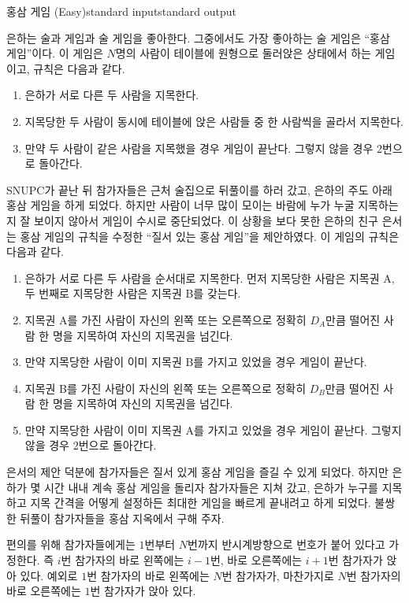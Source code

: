 \begin{problem}{홍삼 게임 (Easy)}{standard input}{standard output}

은하는 술과 게임과 술 게임을 좋아한다. 그중에서도 가장 좋아하는 술 게임은 ``홍삼 게임''이다. 이 게임은 $N$명의 사람이 테이블에 원형으로 둘러앉은 상태에서 하는 게임이고, 규칙은 다음과 같다.

\begin{enumerate}
\item{은하가 서로 다른 두 사람을 지목한다.}
\item{지목당한 두 사람이 동시에 테이블에 앉은 사람들 중 한 사람씩을 골라서 지목한다.}
\item{만약 두 사람이 같은 사람을 지목했을 경우 게임이 끝난다. 그렇지 않을 경우 2번으로 돌아간다.}
\end{enumerate}

SNUPC가 끝난 뒤 참가자들은 근처 술집으로 뒤풀이를 하러 갔고, 은하의 주도 아래 홍삼 게임을 하게 되었다. 하지만 사람이 너무 많이 모이는 바람에 누가 누굴 지목하는지 잘 보이지 않아서 게임이 수시로 중단되었다. 이 상황을 보다 못한 은하의 친구 은서는 홍삼 게임의 규칙을 수정한 ``질서 있는 홍삼 게임''을 제안하였다. 이 게임의 규칙은 다음과 같다.

\begin{enumerate}
\item{은하가 서로 다른 두 사람을 순서대로 지목한다. 먼저 지목당한 사람은 지목권 A, 두 번째로 지목당한 사람은 지목권 B를 갖는다.}
\item{지목권 A를 가진 사람이 자신의 왼쪽 또는 오른쪽으로 정확히 $D_{A}$만큼 떨어진 사람 한 명을 지목하여 자신의 지목권을 넘긴다.}
\item{만약 지목당한 사람이 이미 지목권 B를 가지고 있었을 경우 게임이 끝난다.}
\item{지목권 B를 가진 사람이 자신의 왼쪽 또는 오른쪽으로 정확히 $D_{B}$만큼 떨어진 사람 한 명을 지목하여 자신의 지목권을 넘긴다.}
\item{만약 지목당한 사람이 이미 지목권 A를 가지고 있었을 경우 게임이 끝난다. 그렇지 않을 경우 2번으로 돌아간다.}
\end{enumerate}

은서의 제안 덕분에 참가자들은 질서 있게 홍삼 게임을 즐길 수 있게 되었다. 하지만 은하가 몇 시간 내내 계속 홍삼 게임을 돌리자 참가자들은 지쳐 갔고, 은하가 누구를 지목하고 지목 간격을 어떻게 설정하든 최대한 게임을 빠르게 끝내려고 하게 되었다. 불쌍한 뒤풀이 참가자들을 홍삼 지옥에서 구해 주자.

편의를 위해 참가자들에게는 $1$번부터 $N$번까지 반시계방향으로 번호가 붙어 있다고 가정한다. 즉 $i$번 참가자의 바로 왼쪽에는 $i-1$번, 바로 오른쪽에는 $i+1$번 참가자가 앉아 있다. 예외로 $1$번 참가자의 바로 왼쪽에는 $N$번 참가자가, 마찬가지로 $N$번 참가자의 바로 오른쪽에는 $1$번 참가자가 앉아 있다.


\end{problem}
